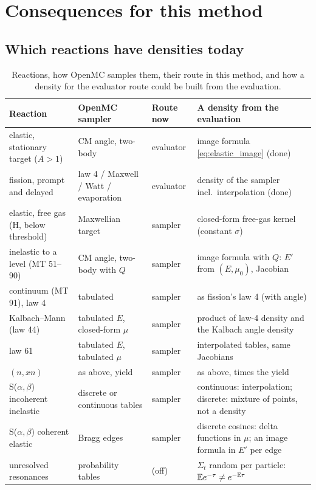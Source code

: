 \section{Consequences for this method}\label{sec:nd:consequences}

\subsection{Which reactions have densities today}

\begin{table}[t]\centering\small
\begin{tabularx}{\textwidth}{>{\raggedright}p{3.3cm}>{\raggedright}p{3.6cm}>{\raggedright}p{2.1cm}X}
\toprule
Reaction & OpenMC sampler & Route now & A density from the evaluation\\
\midrule
elastic, stationary target ($A>1$) & CM angle, two-body & evaluator & image formula \eqref{eq:elastic_image} (done)\\
fission, prompt and delayed & law 4 / Maxwell / Watt / evaporation & evaluator & density of the sampler incl.\ interpolation (done)\\
elastic, free gas (H, below threshold) & Maxwellian target & sampler & closed-form free-gas kernel (constant $\sigma$)\\
inelastic to a level (MT 51--90) & CM angle, two-body with $Q$ & sampler & image formula with $Q$: $E'$ from $(E,\mu_0)$, Jacobian\\
continuum (MT 91), law 4 & tabulated & sampler & as fission's law 4 (with angle)\\
Kalbach--Mann (law 44) & tabulated $E$, closed-form $\mu$ & sampler & product of law-4 density and the Kalbach angle density\\
law 61 & tabulated $E$, tabulated $\mu$ & sampler & interpolated tables, same Jacobians\\
$(n,xn)$ & as above, yield & sampler & as above, times the yield\\
S($\alpha,\beta$) incoherent inelastic & discrete or continuous tables & sampler & continuous: interpolation; discrete: mixture of points, not a density\\
S($\alpha,\beta$) coherent elastic & Bragg edges & sampler & discrete cosines: delta functions in $\mu$; an image formula in $E'$ per edge\\
unresolved resonances & probability tables & (off) & $\Sigma_t$ random per particle: $\mathbb E e^{-\tau}\ne e^{-\mathbb E\tau}$\\
\bottomrule
\end{tabularx}
\caption{Reactions, how OpenMC samples them, their route in this method, and how a density for the
evaluator route could be built from the evaluation.}\label{tab:nd:routes}
\end{table}

